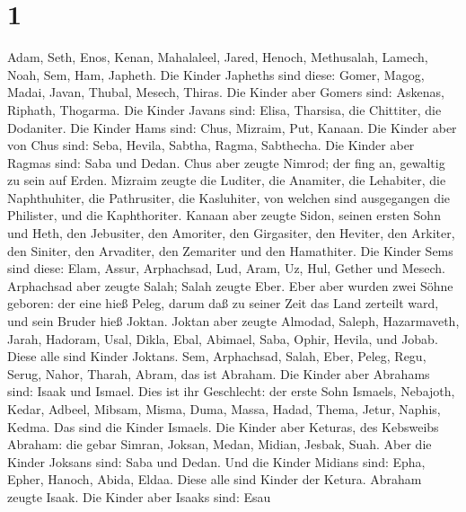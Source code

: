 \hypertarget{section}{%
\section{1}\label{section}}

 Adam, Seth, Enos,  Kenan, Mahalaleel, Jared,
 Henoch, Methusalah, Lamech,  Noah, Sem, Ham,
Japheth.  Die Kinder Japheths sind diese: Gomer, Magog,
Madai, Javan, Thubal, Mesech, Thiras.  Die Kinder aber
Gomers sind: Askenas, Riphath, Thogarma.  Die Kinder Javans
sind: Elisa, Tharsisa, die Chittiter, die Dodaniter.  Die
Kinder Hams sind: Chus, Mizraim, Put, Kanaan.  Die Kinder
aber von Chus sind: Seba, Hevila, Sabtha, Ragma, Sabthecha. Die Kinder
aber Ragmas sind: Saba und Dedan.  Chus aber zeugte Nimrod;
der fing an, gewaltig zu sein auf Erden.  Mizraim zeugte
die Luditer, die Anamiter, die Lehabiter, die Naphthuhiter,
 die Pathrusiter, die Kasluhiter, von welchen sind
ausgegangen die Philister, und die Kaphthoriter.  Kanaan
aber zeugte Sidon, seinen ersten Sohn und Heth,  den
Jebusiter, den Amoriter, den Girgasiter,  den Heviter, den
Arkiter, den Siniter,  den Arvaditer, den Zemariter und den
Hamathiter.  Die Kinder Sems sind diese: Elam, Assur,
Arphachsad, Lud, Aram, Uz, Hul, Gether und Mesech. 
Arphachsad aber zeugte Salah; Salah zeugte Eber.  Eber aber
wurden zwei Söhne geboren: der eine hieß Peleg, darum daß zu seiner Zeit
das Land zerteilt ward, und sein Bruder hieß Joktan. 
Joktan aber zeugte Almodad, Saleph, Hazarmaveth, Jarah, 
Hadoram, Usal, Dikla,  Ebal, Abimael, Saba, 
Ophir, Hevila, und Jobab. Diese alle sind Kinder Joktans. 
Sem, Arphachsad, Salah,  Eber, Peleg, Regu, 
Serug, Nahor, Tharah,  Abram, das ist Abraham.
 Die Kinder aber Abrahams sind: Isaak und Ismael.
 Dies ist ihr Geschlecht: der erste Sohn Ismaels, Nebajoth,
Kedar, Adbeel, Mibsam,  Misma, Duma, Massa, Hadad, Thema,
 Jetur, Naphis, Kedma. Das sind die Kinder Ismaels.
 Die Kinder aber Keturas, des Kebsweibs Abraham: die gebar
Simran, Joksan, Medan, Midian, Jesbak, Suah. Aber die Kinder Joksans
sind: Saba und Dedan.  Und die Kinder Midians sind: Epha,
Epher, Hanoch, Abida, Eldaa. Diese alle sind Kinder der Ketura.
 Abraham zeugte Isaak. Die Kinder aber Isaaks sind: Esau
